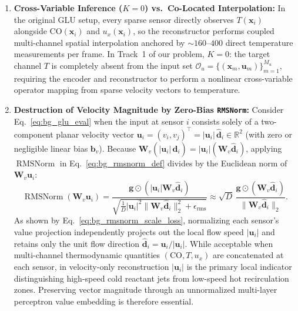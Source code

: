 \begin{enumerate}
    \item \textbf{Cross-Variable Inference ($K = 0$) vs.\ Co-Located Interpolation:} In the original GLU setup, every sparse sensor directly observes $T(\mathbf{x}_i)$ alongside $\text{CO}(\mathbf{x}_i)$ and $u_x(\mathbf{x}_i)$, so the reconstructor performs coupled multi-channel spatial interpolation anchored by $\sim 160\text{--}400$ direct temperature measurements per frame. In Track~1 of our problem, $K = 0$: the target channel $T$ is completely absent from the input set $\mathcal{O}_u = \{(\mathbf{x}_m, \mathbf{u}_m)\}_{m=1}^{M_u}$, requiring the encoder and reconstructor to perform a nonlinear cross-variable operator mapping from sparse velocity vectors to temperature.
    \item \textbf{Destruction of Velocity Magnitude by Zero-Bias \texttt{RMSNorm}:} Consider Eq.~\eqref{eq:bg_glu_eval} when the input at sensor $i$ consists solely of a two-component planar velocity vector $\mathbf{u}_i = (v_{i}, v_{j})^\top = |\mathbf{u}_i|\,\hat{\mathbf{d}}_i \in \mathbb{R}^2$ (with zero or negligible linear bias $\mathbf{b}_v$). Because $\mathbf{W}_v (|\mathbf{u}_i|\,\hat{\mathbf{d}}_i) = |\mathbf{u}_i| (\mathbf{W}_v \hat{\mathbf{d}}_i)$, applying $\operatorname{RMSNorm}$ in Eq.~\eqref{eq:bg_rmsnorm_def} divides by the Euclidean norm of $\mathbf{W}_v \mathbf{u}_i$:
    \begin{equation}
        \operatorname{RMSNorm}(\mathbf{W}_v \mathbf{u}_i) = \frac{\mathbf{g} \odot (|\mathbf{u}_i| \mathbf{W}_v \hat{\mathbf{d}}_i)}{\sqrt{\frac{1}{D}|\mathbf{u}_i|^2 \|\mathbf{W}_v \hat{\mathbf{d}}_i\|_2^2 + \epsilon_{\text{rms}}}} \approx \sqrt{D}\,\frac{\mathbf{g} \odot (\mathbf{W}_v \hat{\mathbf{d}}_i)}{\|\mathbf{W}_v \hat{\mathbf{d}}_i\|_2}.
        \label{eq:bg_rmsnorm_scale_loss}
    \end{equation}
    As shown by Eq.~\eqref{eq:bg_rmsnorm_scale_loss}, normalizing each sensor's value projection independently projects out the local flow speed $|\mathbf{u}_i|$ and retains only the unit flow direction $\hat{\mathbf{d}}_i = \mathbf{u}_i / |\mathbf{u}_i|$. While acceptable when multi-channel thermodynamic quantities $(\text{CO}, T, u_x)$ are concatenated at each sensor, in velocity-only reconstruction $|\mathbf{u}_i|$ is the primary local indicator distinguishing high-speed cold reactant jets from low-speed hot recirculation zones. Preserving vector magnitude through an unnormalized multi-layer perceptron value embedding is therefore essential.

\end{enumerate}
